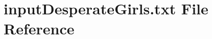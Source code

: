 \hypertarget{inputDesperateGirls_8txt}{}\section{input\+Desperate\+Girls.\+txt File Reference}
\label{inputDesperateGirls_8txt}
